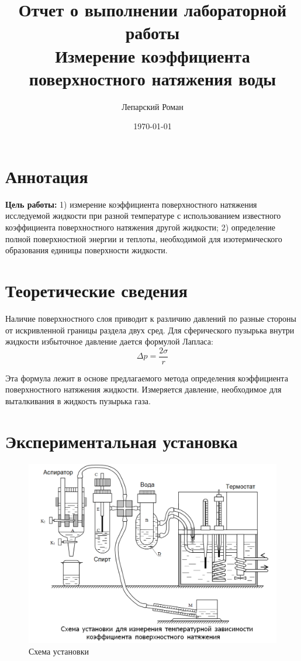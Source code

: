 \documentclass[12pt]{article}
\title{Отчет о выполнении лабораторной работы \\ Измерение коэффициента поверхностного натяжения воды}
\author{Лепарский Роман}
\date{\today}
\begin{document}
\maketitle

\newpage

\section{Аннотация}

\textbf{Цель работы:} 1) измерение коэффициента поверхностного натяжения исследуемой жидкости при разной температуре с использованием известного коэффициента поверхностного натяжения другой жидкости; 2) определение полной поверхностной энергии и теплоты, необходимой для изотермического образования единицы поверхности жидкости.

\section{Теоретические сведения}

Наличие поверхностного слоя приводит к различию давлений по разные стороны от искривленной границы раздела двух сред. Для сферического пузырька внутри жидкости избыточное давление дается формулой Лапласа:
\begin{equation}
\Delta p = \frac{2\sigma}{r}
\end{equation}

Эта формула лежит в основе предлагаемого метода определения коэффициента поверхностного натяжения жидкости. Измеряется давление, необходимое для выталкивания в жидкость пузырька газа.

\section{Экспериментальная установка}

\begin{figure}[H]
	\centering
	\includegraphics[scale = 0.5]{./images/stand.png}
	\caption{Схема установки}
	\label{fig:stand}
\end{figure}
\end{document}
